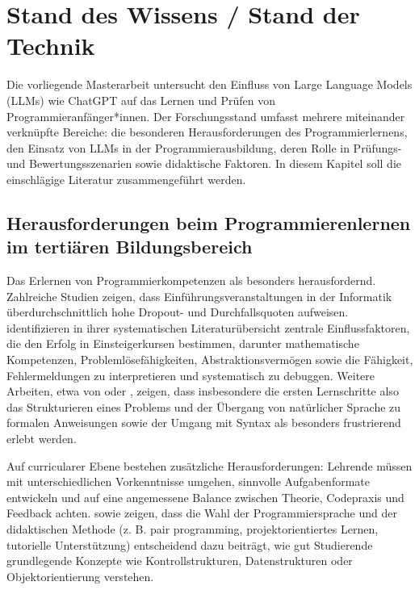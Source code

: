 

\chapter{Stand des Wissens / Stand der Technik} \label{cha:standDesWissens}
Die vorliegende Masterarbeit untersucht den Einfluss von Large Language Models (LLMs) wie ChatGPT auf das Lernen und Prüfen von Programmieranfänger*innen. Der Forschungsstand umfasst mehrere miteinander verknüpfte Bereiche: die besonderen Herausforderungen des Programmierlernens, den Einsatz von LLMs in der Programmierausbildung, deren Rolle in Prüfungs- und Bewertungsszenarien sowie didaktische Faktoren. In diesem Kapitel soll die einschlägige Literatur zusammengeführt werden.


\section{Herausforderungen beim Programmierenlernen im tertiären Bildungsbereich}
Das Erlernen von Programmierkompetenzen als besonders herausfordernd. Zahlreiche Studien zeigen, dass Einführungsveranstaltungen in der Informatik überdurchschnittlich hohe Dropout- und Durchfallsquoten aufweisen. \textcite[S.~6]{SystematicLiteratureReview2019} identifizieren in ihrer systematischen Literaturübersicht zentrale Einflussfaktoren, die den Erfolg in Einsteigerkursen bestimmen, darunter mathematische Kompetenzen, Problemlösefähigkeiten, Abstraktionsvermögen sowie die Fähigkeit, Fehlermeldungen zu interpretieren und systematisch zu debuggen. Weitere Arbeiten, etwa von \textcite[S.~2]{TeachingIntroductoryQuantitive} oder \textcite[S.~1]{studentPerformance}, zeigen, dass insbesondere die ersten Lernschritte also das Strukturieren eines Problems und der Übergang von natürlicher Sprache zu formalen Anweisungen sowie der Umgang mit Syntax als besonders frustrierend erlebt werden.

Auf curricularer Ebene bestehen zusätzliche Herausforderungen: Lehrende müssen mit unterschiedlichen Vorkenntnisse umgehen, sinnvolle Aufgabenformate entwickeln und auf eine angemessene Balance zwischen Theorie, Codepraxis und Feedback achten. \textcite[S.~7]{SystematicReviewFinnland} sowie \textcite[S.~7-8]{DesigningAndDeploying} zeigen, dass die Wahl der Programmiersprache und der didaktischen Methode (z. B. pair programming, projektorientiertes Lernen, tutorielle Unterstützung) entscheidend dazu beiträgt, wie gut Studierende grundlegende Konzepte wie Kontrollstrukturen, Datenstrukturen oder Objektorientierung verstehen.



